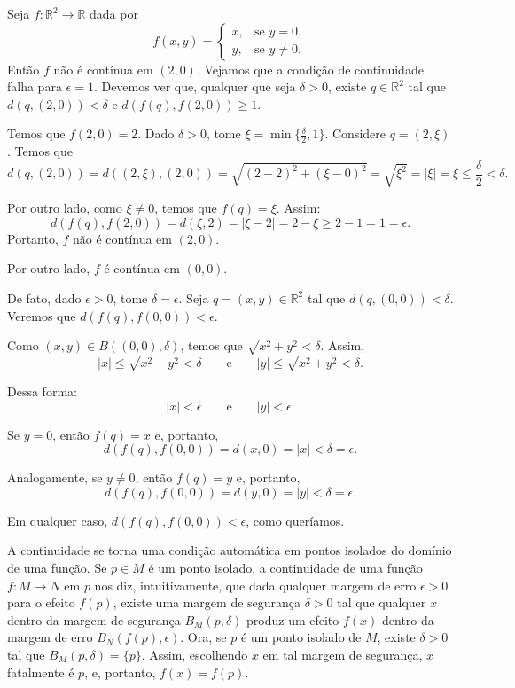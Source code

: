 \begin{example}\label{ex:funcaoDescontinua}
    Seja $f: \mathbb R^2\rightarrow \mathbb R$ dada por
    \[
        f(x, y) = \begin{cases}
            x, & \text{se } y = 0, \\
            y, & \text{se } y \neq 0.
        \end{cases}
    \]
    Então $f$ não é contínua em $(2, 0)$.
    Vejamos que a condição de continuidade falha para $\epsilon=1$.
    Devemos ver que, qualquer que seja $\delta>0$, existe $q \in \mathbb R^2$ tal que $d(q, (2, 0)) < \delta$ e $d(f(q), f(2, 0)) \geq 1$.

    Temos que $f(2, 0) = 2$.
    Dado $\delta>0$, tome $\xi=\min\{\frac{\delta}{2}, 1\}$.
    Considere $q = (2, \xi)$.
    Temos que
    \[
        d(q, (2, 0))= d((2, \xi), (2, 0)) = \sqrt{(2-2)^2 + (\xi - 0)^2} = \sqrt{\xi^2} = |\xi|=\xi\leq \frac{\delta}{2} < \delta.
    \]

    Por outro lado, como $\xi \neq 0$, temos que $f(q) = \xi$.
    Assim:
    \[
        d(f(q), f(2, 0)) = d(\xi, 2) = |\xi - 2| = 2 - \xi \geq 2 - 1 = 1=\epsilon.
    \]
    Portanto, $f$ não é contínua em $(2, 0)$.
    \smallskip

    Por outro lado, $f$ é contínua em $(0, 0)$.

    De fato, dado $\epsilon>0$, tome $\delta = \epsilon$.
    Seja $q = (x, y) \in \mathbb R^2$ tal que $d(q, (0, 0)) < \delta$.
    Veremos que $d(f(q), f(0, 0)) < \epsilon$.

    Como $(x, y)\in B((0, 0), \delta)$, temos que $\sqrt{x^2 + y^2} < \delta$.
    Assim,
    \[
        |x|\leq \sqrt{x^2+y^2}<\delta
        \qquad\text{e}\qquad
        |y|\leq \sqrt{x^2+y^2}<\delta.
    \]

    Dessa forma:
    \[
        |x| < \epsilon \qquad \text{e} \qquad |y| < \epsilon.
    \]

    Se $y=0$, então $f(q) = x$ e, portanto,
    \[
        d(f(q), f(0, 0)) = d(x, 0) = |x| < \delta=\epsilon.
    \]

    Analogamente, se $y\neq 0$, então $f(q)=y$ e, portanto,
    \[
        d(f(q), f(0, 0)) = d(y, 0) = |y| < \delta=\epsilon.
    \]

    Em qualquer caso, $d(f(q), f(0, 0)) < \epsilon$, como queríamos.
\end{example}



A continuidade se torna uma condição automática em pontos isolados do domínio de uma função.
Se $p \in M$ é um ponto isolado, a continuidade de uma função $f: M\rightarrow N$ em $p$ nos diz, intuitivamente, que dada qualquer margem de erro $\epsilon>0$ para o efeito $f(p)$, existe uma margem de segurança $\delta>0$ tal que qualquer $x$ dentro da margem de segurança $B_M(p, \delta)$ produz um efeito $f(x)$ dentro da margem de erro $B_N(f(p), \epsilon)$.
Ora, se $p$ é um ponto isolado de $M$, existe $\delta>0$ tal que $B_M(p, \delta) = \{p\}$.
Assim, escolhendo $x$ em tal margem de segurança, $x$ fatalmente é $p$, e, portanto, $f(x)=f(p)$.

